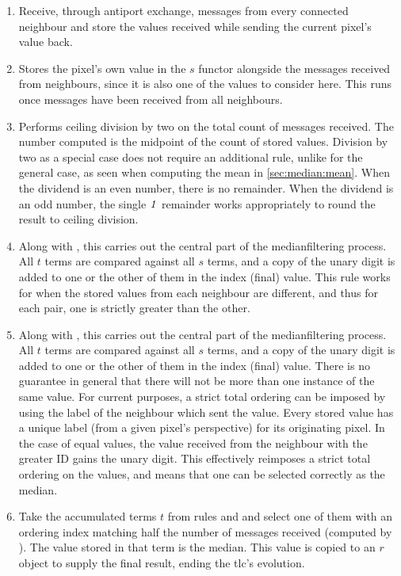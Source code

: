 \begin{enumerate}
    \item Receive, through antiport exchange, messages from every connected neighbour and store the values received while sending the current pixel's value back.
    \item Stores the pixel's own value in the \(s\) functor alongside the messages received from neighbours, since it is also one of the values to consider here.  This runs once messages have been received from all neighbours.
    \item Performs ceiling division by two on the total count of messages received.  The number computed is the midpoint of the count of stored values.  Division by two as a special case does not require an additional rule, unlike for the general case, as seen when computing the mean in \vref{sec:median:mean}.  When the dividend is an even number, there is no remainder.  When the dividend is an odd number, the single \(\mathit{1}\) remainder works appropriately to round the result to ceiling division.
    \item Along with , this carries out the central part of the \gls{medianfilter}ing process.  All \(t\) terms are compared against all \(s\) terms, and a copy of the unary digit is added to one or the other of them in the index (final) value.  This rule works for when the stored values from each neighbour are different, and thus for each pair, one is strictly greater than the other.
    \item Along with , this carries out the central part of the \gls{medianfilter}ing process.  All \(t\) terms are compared against all \(s\) terms, and a copy of the unary digit is added to one or the other of them in the index (final) value.  There is no guarantee in general that there will not be more than one instance of the same value.  For current purposes, a strict total ordering can be imposed by using the label of the neighbour which sent the value.  Every stored value has a unique label (from a given pixel's perspective) for its originating pixel.  In the case of equal values, the value received from the neighbour with the greater ID gains the unary digit.  This effectively reimposes a strict total ordering on the values, and means that one can be selected correctly as the median.
    \item Take the accumulated terms \(t\) from rules  and  and select one of them with an ordering index matching half the number of messages received (computed by ).  The value stored in that term is the median.  This value is copied to an \(r\) object to supply the final result, ending the \gls{tlc}'s evolution.
\end{enumerate}


